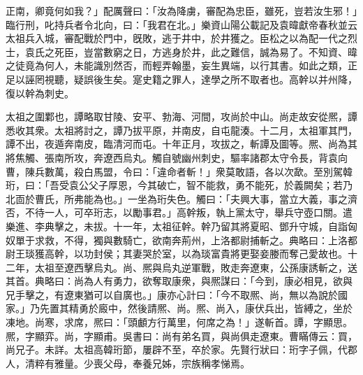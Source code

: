 \begin{pinyinscope}
正南，卿竟何如我？」配厲聲曰：「汝為降虜，審配為忠臣，雖死，豈若汝生邪！」臨行刑，叱持兵者令北向，曰：「我君在北。」樂資山陽公載記及袁暐獻帝春秋並云太祖兵入城，審配戰於門中，旣敗，逃于井中，於井獲之。臣松之以為配一代之烈士，袁氏之死臣，豈當數窮之日，方逃身於井，此之難信，誠為易了。不知資、暐之徒竟為何人，未能識別然否，而輕弄翰墨，妄生異端，以行其書。如此之類，正足以誣罔視聽，疑誤後生矣。寔史籍之罪人，達學之所不取者也。高幹以并州降，復以幹為刺史。

太祖之圍鄴也，譚略取甘陵、安平、勃海、河間，攻尚於中山。尚走故安從熈，譚悉收其衆。太祖將討之，譚乃拔平原，并南皮，自屯龍湊。十二月，太祖軍其門，譚不出，夜遁奔南皮，臨清河而屯。十年正月，攻拔之，斬譚及圖等。熈、尚為其將焦觸、張南所攻，奔遼西烏丸。觸自號幽州刺史，驅率諸郡太守令長，背袁向曹，陳兵數萬，殺白馬盟，令曰：「違命者斬！」衆莫敢語，各以次歃。至別駕韓珩，曰：「吾受袁公父子厚恩，今其破亡，智不能救，勇不能死，於義闕矣；若乃北靣於曹氏，所弗能為也。」一坐為珩失色。觸曰：「夫興大事，當立大義，事之濟否，不待一人，可卒珩志，以勵事君。」高幹叛，執上黨太守，舉兵守壺口關。遣樂進、李典擊之，未拔。十一年，太祖征幹。幹乃留其將夏昭、鄧升守城，自詣匈奴單于求救，不得，獨與數騎亡，欲南奔荊州，上洛都尉捕斬之。典略曰：上洛都尉王琰獲高幹，以功封侯；其妻哭於室，以為琰富貴將更娶妾媵而奪己愛故也。十二年，太祖至遼西擊烏丸。尚、熈與烏丸逆軍戰，敗走奔遼東，公孫康誘斬之，送其首。典略曰：尚為人有勇力，欲奪取康衆，與熈謀曰：「今到，康必相見，欲與兄手擊之，有遼東猶可以自廣也。」康亦心計曰：「今不取熈、尚，無以為說於國家。」乃先置其精勇於廄中，然後請熈、尚。熈、尚入，康伏兵出，皆縛之，坐於凍地。尚寒，求席，熈曰：「頭顱方行萬里，何席之為！」遂斬首。譚，字顯思。熈，字顯弈。尚，字顯甫。吳書曰：尚有弟名買，與尚俱走遼東。曹瞞傳云：買，尚兄子。未詳。太祖高韓珩節，屢辟不至，卒於家。先賢行狀曰：珩字子佩，代郡人，清粹有雅量。少喪父母，奉養兄姊，宗族稱孝悌焉。


\end{pinyinscope}